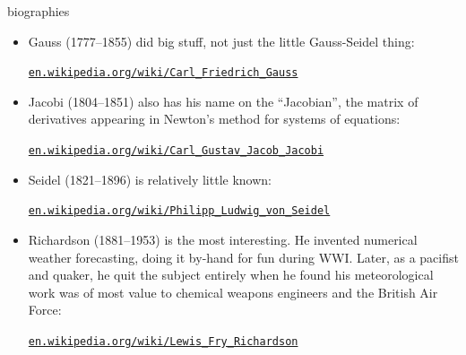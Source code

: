 \documentclass[10pt,hyperref]{beamer}
\begin{document}
\begin{frame}{biographies}

\begin{itemize}
\small
\item Gauss (1777--1855) did big stuff, not just the little Gauss-Seidel thing:

    \centerline{\href{https://en.wikipedia.org/wiki/Carl_Friedrich_Gauss}{\texttt{en.wikipedia.org/wiki/Carl\_Friedrich\_Gauss}}}

\medskip
\item Jacobi (1804--1851) also has his name on the ``Jacobian'', the matrix of derivatives appearing in Newton's method for systems of equations:

    \centerline{\href{https://en.wikipedia.org/wiki/Carl_Gustav_Jacob_Jacobi}{\texttt{en.wikipedia.org/wiki/Carl\_Gustav\_Jacob\_Jacobi}}}

\medskip
\item Seidel (1821--1896) is relatively little known:

    \centerline{\href{https://en.wikipedia.org/wiki/Philipp_Ludwig_von_Seidel}{\texttt{en.wikipedia.org/wiki/Philipp\_Ludwig\_von\_Seidel}}}

\medskip
\item Richardson (1881--1953) is the most interesting.  He invented numerical weather forecasting, doing it by-hand for fun during WWI.  Later, as a pacifist and quaker, he quit the subject entirely when he found his meteorological work was of most value to chemical weapons engineers and the British Air Force:

    \centerline{\href{https://en.wikipedia.org/wiki/Lewis_Fry_Richardson}{\texttt{en.wikipedia.org/wiki/Lewis\_Fry\_Richardson}}}
\end{itemize}
\end{frame}
\end{document}
